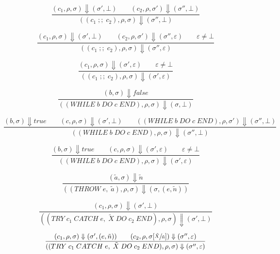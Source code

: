 \begin{equation}
\frac{(c_1, \rho, \sigma) \Downarrow (\sigma', \bot) \qquad (c_2, \rho, \sigma') \Downarrow (\sigma'', \bot)}{((c_1\; ;;\; c_2), \rho, \sigma) \Downarrow (\sigma'', \bot)}
\end{equation}

\begin{equation}
\frac{(c_1, \rho, \sigma) \Downarrow (\sigma', \bot) \qquad (c_2, \rho, \sigma') \Downarrow (\sigma'', \varepsilon) \qquad \varepsilon \neq \bot}{((c_1\; ;;\; c_2), \rho, \sigma) \Downarrow (\sigma'', \varepsilon)}
\end{equation}

\begin{equation}
\frac{(c_1, \rho, \sigma) \Downarrow (\sigma', \varepsilon) \qquad \varepsilon \neq \bot}{((c_1\; ;;\; c_2), \rho, \sigma) \Downarrow (\sigma', \varepsilon)}
\end{equation}

\begin{equation}
\frac{(b, \sigma) \Downarrow false}{((WHILE\; b\; DO\; c\; END), \rho, \sigma) \Downarrow (\sigma, \bot)}
\end{equation}

\begin{equation}
\frac{(b, \sigma) \Downarrow true \qquad (c, \rho, \sigma) \Downarrow (\sigma', \bot) \qquad ((WHILE\; b\; DO\; c\; END), \rho, \sigma') \Downarrow (\sigma'', \bot)}{((WHILE\; b\; DO\; c\; END), \rho, \sigma) \Downarrow (\sigma'', \bot)}
\end{equation}

\begin{equation}
\frac{(b, \sigma) \Downarrow true \qquad (c, \rho, \sigma) \Downarrow (\sigma', \varepsilon) \qquad \varepsilon \neq \bot}{((WHILE\; b\; DO\; c\; END), \rho, \sigma) \Downarrow (\sigma', \varepsilon)}
\end{equation}

\begin{equation}
\frac{(\tilde{a}, \sigma) \Downarrow \tilde{n}}{((THROW\; e,\; \tilde{a}), \rho, \sigma) \Downarrow (\sigma, (e, \tilde{n}))}
\end{equation}

\begin{equation}
\frac{(c_1, \rho, \sigma) \Downarrow (\sigma', \bot)}{((TRY\; c_1\; CATCH\; e,\; \tilde{X}\; DO\; c_2\; END), \rho, \sigma) \Downarrow (\sigma', \bot)}
\end{equation}

\begin{equation}
\frac{(c_1, \rho, \sigma) \Downarrow (\sigma', (e, \tilde{n})) \qquad (c_2, \rho, \sigma[\sfrac{\tilde{X}}{\tilde{n}}]) \Downarrow (\sigma'', \varepsilon)}{((TRY\; c_1\; CATCH\; e,\; \tilde{X}\; DO\; c_2\; END), \rho, \sigma) \Downarrow (\sigma'', \varepsilon)}
\end{equation}

